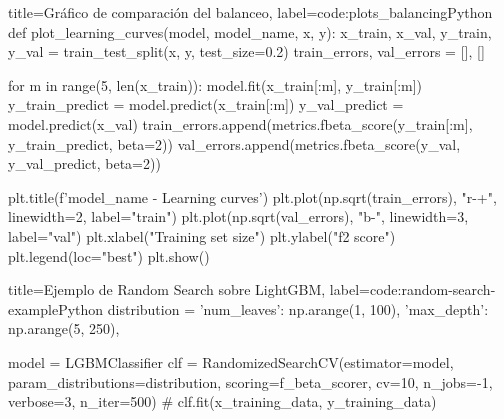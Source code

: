 \begin{code}[numbers=left]{title=Gráfico de comparación del balanceo, label=code:plots_balancing}{Python}
def plot_learning_curves(model, model_name, x, y):
    x_train, x_val, y_train, y_val = train_test_split(x, y, test_size=0.2)
    train_errors, val_errors = [], []
    
    for m in range(5, len(x_train)):
        model.fit(x_train[:m], y_train[:m])
        y_train_predict = model.predict(x_train[:m])
        y_val_predict = model.predict(x_val)
        train_errors.append(metrics.fbeta_score(y_train[:m], y_train_predict, beta=2))
        val_errors.append(metrics.fbeta_score(y_val, y_val_predict, beta=2))
        
    plt.title(f'{model_name} - Learning curves')
    plt.plot(np.sqrt(train_errors), "r-+", linewidth=2, label="train")
    plt.plot(np.sqrt(val_errors), "b-", linewidth=3, label="val")
    plt.xlabel("Training set size")
    plt.ylabel("f2 score")
    plt.legend(loc="best")
    plt.show()
\end{code}

\begin{code}[numbers=left]{title=Ejemplo de Random Search sobre LightGBM, label=code:random-search-example}{Python}
    distribution = {
        'num_leaves': np.arange(1, 100),
        'max_depth': np.arange(5, 250),
    }

    model = LGBMClassifier
    clf = RandomizedSearchCV(estimator=model, param_distributions=distribution,
                             scoring=f_beta_scorer, cv=10,
                             n_jobs=-1, verbose=3, n_iter=500)
    # clf.fit(x_training_data, y_training_data)
\end{code}